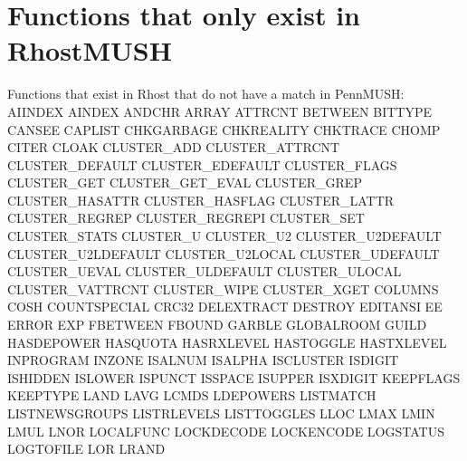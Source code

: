 \documentclass[letterpaper,10pt,english]{sphinxmanual}
\begin{document}
\section{Functions that only exist in RhostMUSH}
\label{\detokenize{31-comparison:functions-that-only-exist-in-rhostmush}}
\sphinxAtStartPar
Functions that exist in Rhost that do not have a match in PennMUSH:
AIINDEX                      AINDEX                        ANDCHR
ARRAY                        ATTRCNT                       BETWEEN
BITTYPE                      CANSEE                        CAPLIST
CHKGARBAGE                   CHKREALITY                    CHKTRACE
CHOMP                        CITER                         CLOAK
CLUSTER\_ADD                  CLUSTER\_ATTRCNT               CLUSTER\_DEFAULT
CLUSTER\_EDEFAULT             CLUSTER\_FLAGS                 CLUSTER\_GET
CLUSTER\_GET\_EVAL             CLUSTER\_GREP                  CLUSTER\_HASATTR
CLUSTER\_HASFLAG              CLUSTER\_LATTR                 CLUSTER\_REGREP
CLUSTER\_REGREPI              CLUSTER\_SET                   CLUSTER\_STATS
CLUSTER\_U                    CLUSTER\_U2                    CLUSTER\_U2DEFAULT
CLUSTER\_U2LDEFAULT           CLUSTER\_U2LOCAL               CLUSTER\_UDEFAULT
CLUSTER\_UEVAL                CLUSTER\_ULDEFAULT             CLUSTER\_ULOCAL
CLUSTER\_VATTRCNT             CLUSTER\_WIPE                  CLUSTER\_XGET
COLUMNS                      COSH                          COUNTSPECIAL
CRC32                        DELEXTRACT                    DESTROY
EDITANSI                     EE                            ERROR
EXP                          FBETWEEN                      FBOUND
GARBLE                       GLOBALROOM                    GUILD
HASDEPOWER                   HASQUOTA                      HASRXLEVEL
HASTOGGLE                    HASTXLEVEL                    INPROGRAM
INZONE                       ISALNUM                       ISALPHA
ISCLUSTER                    ISDIGIT                       ISHIDDEN
ISLOWER                      ISPUNCT                       ISSPACE
ISUPPER                      ISXDIGIT                      KEEPFLAGS
KEEPTYPE                     LAND                          LAVG
LCMDS                        LDEPOWERS                     LISTMATCH
LISTNEWSGROUPS               LISTRLEVELS                   LISTTOGGLES
LLOC                         LMAX                          LMIN
LMUL                         LNOR                          LOCALFUNC
LOCKDECODE                   LOCKENCODE                    LOGSTATUS
LOGTOFILE                    LOR                           LRAND
\end{document}
